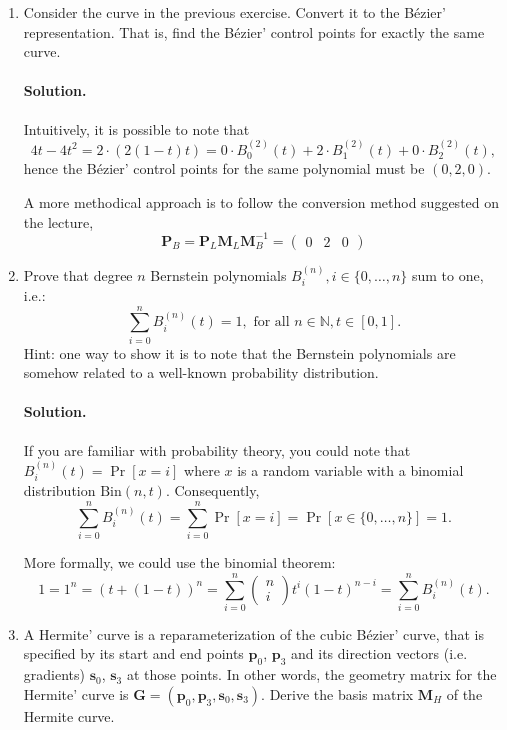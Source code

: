 \documentclass{article}
\newcommand{\bs}{\mathbf{s}}
\newcommand{\bp}{\mathbf{p}}
\newcommand{\bM}{\mathbf{M}}
\newcommand{\bG}{\mathbf{G}}
\newcommand{\bP}{\mathbf{P}}
\newcommand{\Bezier}{B\'{e}zier}
\newcommand{\vectwo}[2]{\left(\begin{matrix} #1 \\ #2 \end{matrix}\right)}
\begin{document}
\begin{enumerate}
\item Consider the curve in the previous exercise. Convert it to the \Bezier' representation. That is, find the \Bezier' control points for exactly the same curve.

\paragraph{Solution.}
Intuitively, it is possible to note that
$$
4t - 4t^2 = 2\cdot(2(1-t)t) = 0\cdot B^{(2)}_0(t) + 2\cdot B^{(2)}_1(t) + 0 \cdot B^{(2)}_2(t),
$$
hence the \Bezier' control points for the same polynomial must be $(0, 2, 0)$.

A more methodical approach is to follow the conversion method suggested on the lecture,
$$
\bP_B = \bP_L\bM_L\bM_B^{-1} = \left(\begin{matrix} 0 & 2 & 0 \end{matrix}\right)
$$

\item Prove that degree $n$ Bernstein polynomials $B_i^{(n)}, i\in\{0, \dots, n\}$ sum to one, i.e.:
$$
\sum_{i=0}^n B_i^{(n)}(t) = 1,\text{   for all   }n\in\mathbb{N}, t\in[0,1].
$$
Hint: one way to show it is to note that the Bernstein polynomials are somehow related to a well-known probability distribution.

\paragraph{Solution.}
If you are familiar with probability theory, you could note that $B^{(n)}_i(t) = \Pr[x=i]$ where $x$ is a random variable with a binomial distribution $\text{Bin}(n, t)$. Consequently,
$$
\sum_{i=0}^n B^{(n)}_i(t) = \sum_{i=0}^n \Pr[x=i] = \Pr[x\in\{0,\dots,n\}] = 1.
$$

More formally, we could use the binomial theorem:
$$
1 = 1^n = (t + (1-t))^n = \sum_{i=0}^n \vectwo{n}{i} t^i(1-t)^{n-i} = \sum_{i=0}^n B_i^{(n)}(t).
$$

\item A Hermite' curve is a reparameterization of the cubic \Bezier' curve, that is specified by its start and end points $\bp_0$, $\bp_3$ and its direction vectors (i.e. gradients) $\bs_0$, $\bs_3$ at those points. In other words, the geometry matrix for the Hermite' curve is $\bG=(\bp_0, \bp_3, \bs_0, \bs_3)$. Derive the basis matrix $\bM_H$ of the Hermite curve.


\end{enumerate}
\end{document}
